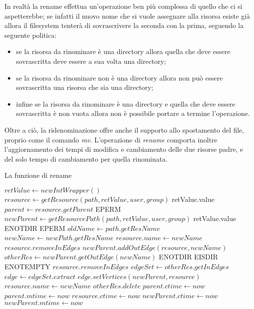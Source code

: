 In realtà la rename effettua un'operazione ben più complessa di quello che ci si aspetterebbe; se infatti il nuovo nome che si vuole assegnare alla risorsa esiste già allora il filesystem tenterà di sovrascrivere la seconda con la prima, seguendo la seguente politica:
\begin {itemize}
\item se la risorsa da rinominare è una directory allora quella che deve essere sovrascritta deve essere a sua volta una directory;
\item se la risorsa da rinominare non è una directory allora non può essere sovrascritta una risorsa che sia una directory;
\item infine se la risorsa da rinominare è una directory e quella che deve essere sovrascritta è non vuota allora non è possibile portare a termine l'operazione.
\end{itemize}

Oltre a ciò, la ridenominazione offre anche il supporto allo spostamento del file, proprio come il comando \emph{mv}. L'operazione di \emph{rename} comporta inoltre l'aggiornamento dei tempi di modifica e cambiamento delle due risorse padre, e del solo tempo di cambiamento per quella rinominata.
\begin{algorithm}
\begin{algorithmic}[5]
\caption{La funzione di rename}
	\State $retValue \gets new IntWrapper()$
	\State $resource \gets getResource(path, retValue, user, group)$
		\State \Return retValue.value
	\EndIf
	\State $parent \gets resource.getParent$
		\State \Return EPERM
	\EndIf
	\State $newParent \gets getResourcePath(path, retValue, user, group)$
		\State \Return retValue.value
	\EndIf
		\State \Return ENOTDIR
	\EndIf
		\State \Return EPERM
	\EndIf
	\State $oldName \gets path.getResName$
	\State $newName \gets newPath.getResName$
		\State $resource.name \gets newName$
		\State $resource.removeInEdges$
		\State $newParent.addOutEdge(resource, newName)$
	\Else
		\State $otherRes \gets newParent.getOutEdge(newName)$
			\State \Return ENOTDIR
		\EndIf
			\State \Return EISDIR
		\EndIf
			\State \Return ENOTEMPTY
		\EndIf
		\State $resource.removeInEdges$
		\State $edgeSet \gets otherRes.getInEdges$
			\State $edge \gets edgeSet.extract$
			\State $edge.setVertices(newParent, resource)$
		\EndWhile
		\State $resource.name \gets newName$
		\State $otherRes.delete$
	\EndIf
	\State $parent.ctime \gets now$
	\State $parent.mtime \gets now$
	\State $resource.ctime \gets now$
	\State $newParent.ctime \gets now$
	\State $newParent.mtime \gets now$
	\State {}
\EndFunction
\end{algorithmic}
\end{algorithm}

